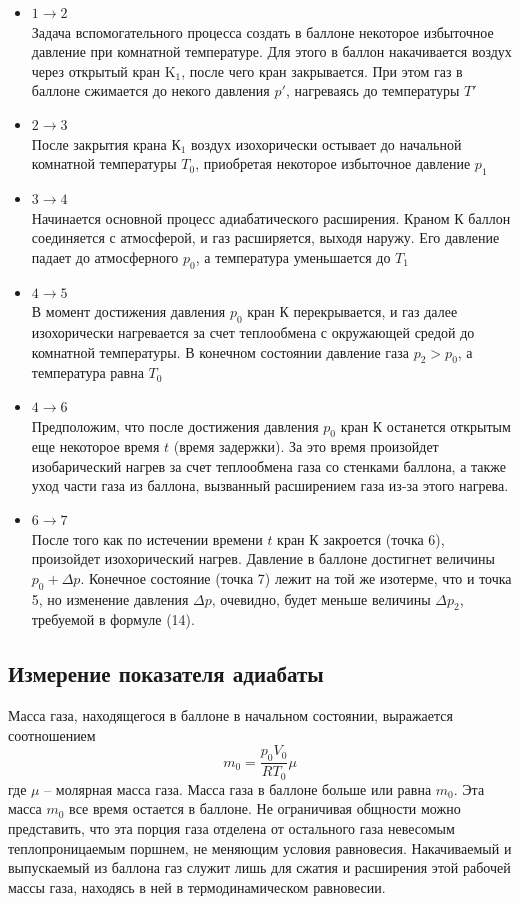 \documentclass[a4paper,12pt]{article}
\theoremstyle{plain} %
\theoremstyle{definition} %
\theoremstyle{remark} %
\begin{document}
\begin{itemize}
	\item $1\rightarrow2$ \\Задача вспомогательного процесса создать в баллоне некоторое избыточное давление при комнатной температуре. Для этого в баллон накачивается воздух через открытый кран $\text{K}_1$, после чего кран закрывается. При этом газ в баллоне сжимается до некого давления $p'$, нагреваясь до температуры $T'$
	\item $2\rightarrow3$ \\После закрытия крана $\text{К}_1$ воздух изохорически остывает до начальной комнатной температуры $T_0$, приобретая некоторое избыточное давление $p_1$
	\item $3\rightarrow4$ \\ Начинается основной процесс адиабатического расширения. Краном $\text{К}$ баллон соединяется с атмосферой, и газ расширяется, выходя наружу. Его давление падает до атмосферного $p_0$, а температура уменьшается до $T_1$
	\item $4\rightarrow5$ \\ В момент достижения давления $p_0$ кран $\text{К}$  перекрывается, и газ далее изохорически нагревается за счет теплообмена с окружающей средой до комнатной температуры. В конечном состоянии давление газа $p_2 > p_0$, а температура равна $T_0$
	\item $4\rightarrow6$\\Предположим, что после достижения давления $p_0$ кран $\text{К}$ останется открытым еще некоторое время $t$ (время задержки). За это время произойдет изобарический нагрев  за счет теплообмена газа со стенками баллона, а также уход части газа из баллона, вызванный расширением газа из-за этого нагрева. 
	\item $6\rightarrow7$\\ После того как по истечении времени $t$ кран $\text{К}$ закроется (точка 6), произойдет изохорический нагрев. Давление в баллоне достигнет величины $p_0 + \Delta p$. Конечное состояние (точка 7) лежит на той же изотерме, что и точка 5, но изменение давления $\Delta p$, очевидно, будет меньше величины $\Delta p_2$, требуемой в формуле (14).
\end{itemize}
\subsection {Измерение показателя адиабаты}
Масса газа, находящегося в баллоне в начальном состоянии, выражается соотношением
\begin{equation}
m_0 = \frac{p_0 V_0}{RT_0} \mu
\end{equation}
где $\mu$ -- молярная масса газа. Масса газа в баллоне больше или равна $m_0$. Эта масса $m_0$ все время остается в баллоне. Не ограничивая общности можно представить, что эта порция газа отделена от остального газа невесомым теплопроницаемым поршнем, не меняющим условия равновесия. Накачиваемый и выпускаемый из баллона газ служит лишь для сжатия и расширения этой рабочей массы газа, находясь в ней в термодинамическом равновесии.
\end{document}
